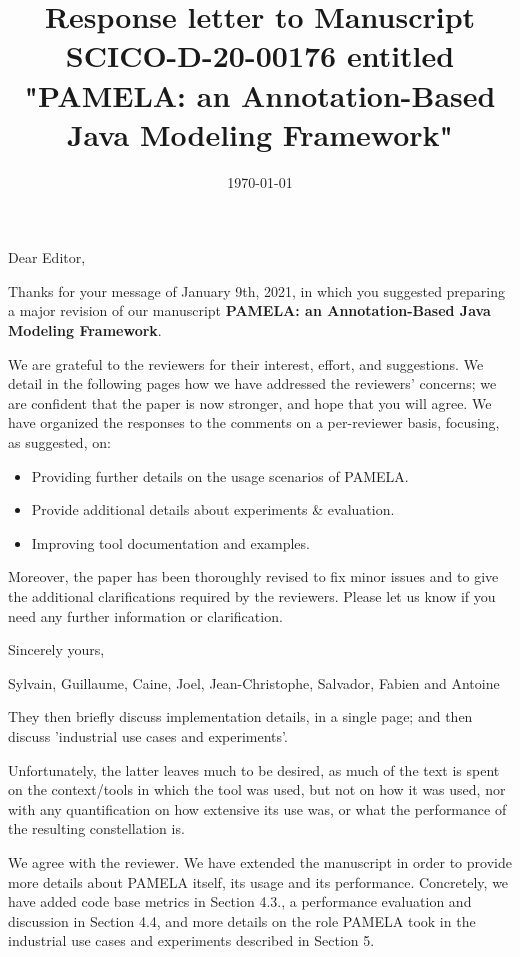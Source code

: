\documentclass[10pt]{article}
\title{Response letter to Manuscript SCICO-D-20-00176 entitled "PAMELA: an Annotation-Based Java Modeling Framework"}
\date{\today}
\begin{document}
Dear Editor,

\bigskip
Thanks for your message of January 9th, 2021, in which you suggested preparing a major revision of our manuscript  \textbf{PAMELA: an Annotation-Based Java Modeling Framework}. 

\bigskip
We are grateful to the reviewers for their interest, effort, and suggestions. We detail in the following pages how we have addressed the reviewers' concerns; we are confident that the paper is now stronger, and hope that you will agree. We have organized the responses to the comments on a per-reviewer basis, focusing, as suggested, on: 

\begin{itemize}
\item Providing further details on the usage scenarios of PAMELA.
\item Provide additional details about experiments \& evaluation.
\item Improving tool documentation and examples.
\end{itemize}

Moreover, the paper has been thoroughly revised to fix minor issues and to give the additional clarifications required by the reviewers. Please let us know if you need any further information or clarification.

\bigskip
Sincerely yours,

\bigskip
Sylvain, Guillaume, Caine, Joel, Jean-Christophe, Salvador, Fabien and Antoine

\pagebreak


\begin{response}{They then briefly discuss implementation details, in a single page; and then discuss 'industrial use cases and experiments'.

Unfortunately, the latter leaves much to be desired, as much of the text is spent on the context/tools in which the tool was used, but not on how it was used, nor with any quantification on how extensive its use was, or what the performance of the resulting constellation is.
} We agree with the reviewer. We have extended the manuscript in order to provide more details about PAMELA itself, its usage and its performance. Concretely, we have added code base metrics in Section 4.3., a performance evaluation and discussion in Section 4.4, and more details on the role PAMELA took in the industrial use cases and experiments described in Section 5.
\end{response}
\end{document}
